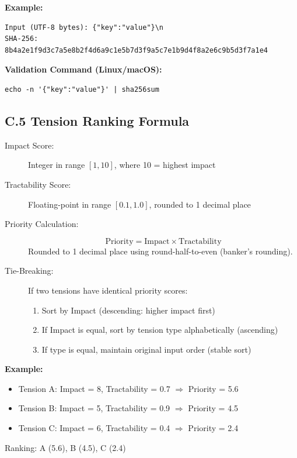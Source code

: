 \documentclass[11pt,a4paper]{article}
\begin{document}
\textbf{Example:}
\begin{verbatim}
Input (UTF-8 bytes): {"key":"value"}\n
SHA-256: 8b4a2e1f9d3c7a5e8b2f4d6a9c1e5b7d3f9a5c7e1b9d4f8a2e6c9b5d3f7a1e4
\end{verbatim}

\textbf{Validation Command (Linux/macOS):}
\begin{verbatim}
echo -n '{"key":"value"}' | sha256sum
\end{verbatim}

\subsection*{C.5 Tension Ranking Formula}

\begin{description}
\item[Impact Score:] Integer in range $[1, 10]$, where 10 = highest impact

\item[Tractability Score:] Floating-point in range $[0.1, 1.0]$, rounded to 1 decimal place

\item[Priority Calculation:] 
\begin{equation*}
\text{Priority} = \text{Impact} \times \text{Tractability}
\end{equation*}
Rounded to 1 decimal place using round-half-to-even (banker's rounding).

\item[Tie-Breaking:] If two tensions have identical priority scores:
\begin{enumerate}
\item Sort by Impact (descending: higher impact first)
\item If Impact is equal, sort by tension type alphabetically (ascending)
\item If type is equal, maintain original input order (stable sort)
\end{enumerate}
\end{description}

\textbf{Example:}
\begin{itemize}
\item Tension A: Impact = 8, Tractability = 0.7 $\Rightarrow$ Priority = 5.6
\item Tension B: Impact = 5, Tractability = 0.9 $\Rightarrow$ Priority = 4.5
\item Tension C: Impact = 6, Tractability = 0.4 $\Rightarrow$ Priority = 2.4
\end{itemize}
Ranking: A (5.6), B (4.5), C (2.4)
\end{document}
